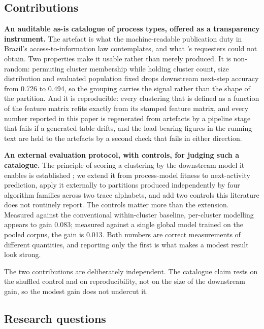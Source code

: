 \subsection*{Contributions}

\textbf{An auditable as-is catalogue of process types, offered as a transparency instrument.}
The artefact is what the machine-readable publication duty in Brazil's access-to-information
law contemplates, and what \citeauthor{brauneis2018algorithmic}'s requesters could not obtain.
Two properties make it usable rather than merely produced. It is non-random: permuting cluster
membership while holding cluster count, size distribution and evaluated population fixed drops
downstream next-step accuracy from 0.726 to 0.494, so the grouping carries the signal rather
than the shape of the partition. And it is reproducible: every clustering that is defined as a function of the feature matrix refits exactly
from its stamped feature matrix, and every number reported in this paper is regenerated from
artefacts by a pipeline stage that fails if a generated table drifts, and the load-bearing
figures in the running text are held to the artefacts by a second check that fails in either
direction.

\textbf{An external evaluation protocol, with controls, for judging such a catalogue.} The
principle of scoring a clustering by the downstream model it enables is established
\citep{deweerdt2013actitrac}; we extend it from process-model fitness to next-activity
prediction, apply it externally to partitions produced independently by four algorithm families
across two trace alphabets, and add two controls this literature does not routinely report. The
controls matter more than the extension. Measured against the conventional within-cluster
baseline, per-cluster modelling appears to gain 0.083; measured against a single global model
trained on the pooled corpus, the gain is 0.013. Both numbers are correct measurements of
different quantities, and reporting only the first is what makes a modest result look strong.

The two contributions are deliberately independent. The catalogue claim rests on the shuffled
control and on reproducibility, not on the size of the downstream gain, so the modest gain does
not undercut it.

\subsection*{Research questions}

